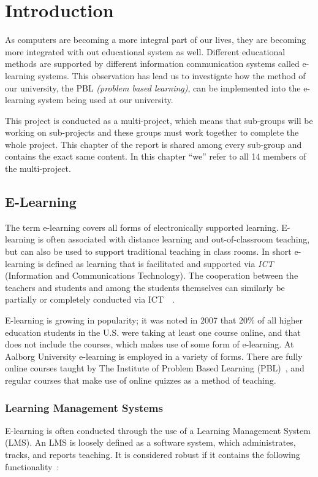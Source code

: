 \chapter{Introduction}
As computers are becoming a more integral part of our lives, they are becoming more integrated with out educational system as well.
Different educational methods are supported by different information communication systems called e-learning systems.
This observation has lead us to investigate how the method of our university, the PBL \emph{(problem based learning)}, can be implemented into the e-learning system being used at our university.

This project is conducted as a multi-project, which means that sub-groups will be working on sub-projects and these groups must work together to complete the whole project.
This chapter of the report is shared among every sub-group and contains the exact same content.
In this chapter ``we'' refer to all 14 members of the multi-project.

\section{E-Learning}
\label{sec:e-learning}
The term e-learning covers all forms of electronically supported learning. 
E-learning is often associated with distance learning and out-of-classroom teaching, but can also be used to support traditional teaching in class rooms. 
In short e-learning is defined as learning that is facilitated and supported via \emph{ICT} (Information and Communications Technology). 
The cooperation between the teachers and students and among the students themselves can similarly be partially or completely conducted via ICT~\cite{def-e-learning1}~\cite{def-e-learning2}.

E-learning is growing in popularity; it was noted in 2007 that 20\% of all higher education students in the U.S. were taking at least one course online, and that does not include the courses, which makes use of some form of e-learning.	
At Aalborg University e-learning is employed in a variety of forms. 
There are fully online courses taught by The Institute of Problem Based Learning (PBL)~\cite{mpbl}, and regular courses that make use of online quizzes as a method of teaching.

\subsection{Learning Management Systems}
\label{sub:lms}
E-learning is often conducted through the use of a Learning Management System (LMS). 
An LMS is loosely defined as a software system, which administrates, tracks, and reports teaching. 
It is considered robust if it contains the following functionality~\citep{Ellis09}:

